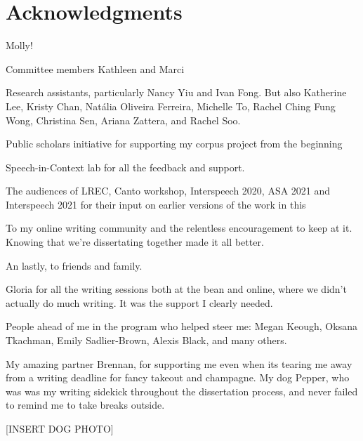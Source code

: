 
\chapter{Acknowledgments}

Molly! 

Committee members Kathleen and Marci 

Research assistants, particularly Nancy Yiu and Ivan Fong. But also Katherine Lee, Kristy Chan, Natália Oliveira Ferreira, Michelle To, Rachel Ching Fung Wong, Christina Sen, Ariana Zattera, and Rachel Soo. 

Public scholars initiative for supporting my corpus project from the beginning

Speech-in-Context lab for all the feedback and support.

The audiences of LREC, Canto workshop, Interspeech 2020, ASA 2021 and Interspeech 2021 for their input on earlier versions of the work in this 

To my online writing community and the relentless encouragement to keep at it. Knowing that we're dissertating together made it all better. 

An lastly, to friends and family. 

Gloria for all the writing sessions both at the bean and online, where we didn't actually do much writing. It was the support I clearly needed. 

People ahead of me in the program who helped steer me: Megan Keough, Oksana Tkachman, Emily Sadlier-Brown, Alexis Black, and many others. 

My amazing partner Brennan, for supporting me even when its tearing me away from a writing deadline for fancy takeout and champagne. My dog Pepper, who was was my writing sidekick throughout the dissertation process, and never failed to remind me to take breaks outside. 

[INSERT DOG PHOTO]

\endinput %
